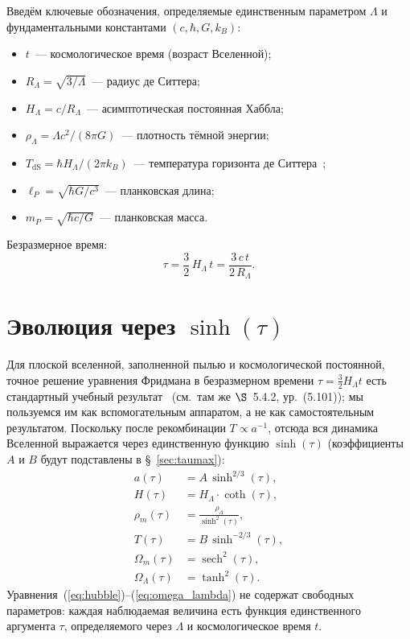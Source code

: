 \documentclass[12pt,a4paper]{article}
\begin{document}
Введём ключевые обозначения, определяемые единственным параметром $\Lambda$ и фундаментальными константами $(c, \hbar, G, k_B)$:

\begin{itemize}
\item $t$~--- космологическое время (возраст Вселенной);
\item $R_\Lambda = \sqrt{3/\Lambda}$~--- радиус де Ситтера;
\item $H_\Lambda = c/R_\Lambda$~--- асимптотическая постоянная Хаббла;
\item $\rho_\Lambda = \Lambda c^2/(8\pi G)$~--- плотность тёмной энергии;
\item $T_{\mathrm{dS}} = \hbar H_\Lambda/(2\pi k_B)$~--- температура горизонта де Ситтера~\cite{GibbonsHawking1977};
\item $\ell_P = \sqrt{\hbar G/c^3}$~--- планковская длина;
\item $m_P = \sqrt{\hbar c/G}$~--- планковская масса.
\end{itemize}

Безразмерное время:
\begin{equation}
\boxed{\tau = \frac{3}{2}\,H_\Lambda\,t = \frac{3\,c\,t}{2\,R_\Lambda}.}
\end{equation}

\section{Эволюция через \texorpdfstring{$\sinh(\tau)$}{sinh(τ)}}
\label{sec:sinh}

Для плоской вселенной, заполненной пылью и космологической постоянной, точное решение уравнения Фридмана в безразмерном времени $\tau=\tfrac{3}{2}H_\Lambda t$ есть стандартный учебный результат~\cite{Ryden2017} (см.~там же $\S$~5.4.2, ур.~(5.101)); мы пользуемся им как вспомогательным аппаратом, а не как самостоятельным результатом. Поскольку после рекомбинации $T \propto a^{-1}$, отсюда вся динамика Вселенной выражается через единственную функцию $\sinh(\tau)$ (коэффициенты $A$ и $B$ будут подставлены в \S~\ref{sec:taumax}):
\begin{align}
a(\tau) &= A\,\sinh^{2/3}(\tau), \label{eq:a_sinh} \\[6pt]
H(\tau) &= H_\Lambda \cdot \coth(\tau), \label{eq:hubble} \\[6pt]
\rho_m(\tau) &= \frac{\rho_\Lambda}{\sinh^2(\tau)}, \label{eq:rho_m} \\[6pt]
T(\tau) &= B\,\sinh^{-2/3}(\tau), \label{eq:temp_sinh} \\[6pt]
\Omega_m(\tau) &= \operatorname{sech}^2(\tau), \label{eq:omega_m} \\[6pt]
\Omega_\Lambda(\tau) &= \tanh^2(\tau). \label{eq:omega_lambda}
\end{align}
Уравнения~(\ref{eq:hubble})--(\ref{eq:omega_lambda}) не содержат свободных параметров: каждая наблюдаемая величина есть функция единственного аргумента $\tau$, определяемого через $\Lambda$ и космологическое время $t$.
\end{document}
